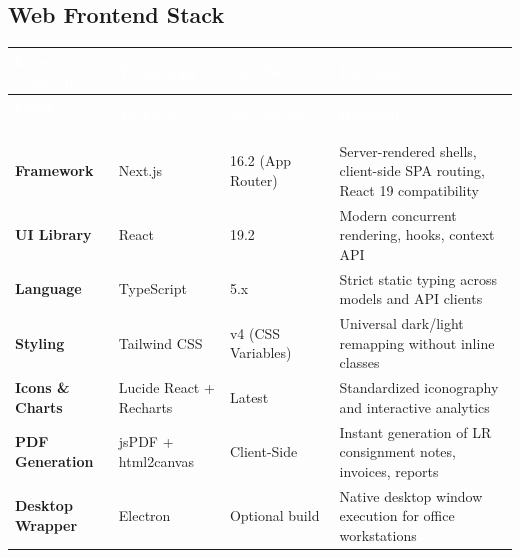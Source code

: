 \documentclass[11pt,a4paper]{article}
\newcommand{\theadstyle}[1]{\textcolor{white}{\bfseries #1}}
\begin{document}
\subsection{Web Frontend Stack}
\begin{longtable}{>{\bfseries}L{2.9cm} L{2.6cm} L{3.0cm} L{4.3cm}}
\theadstyle{Layer / Concern} & \theadstyle{Technology} & \theadstyle{Specification} & \theadstyle{Rationale} \\
\endfirsthead
{}
\theadstyle{Layer / Concern} & \theadstyle{Technology} & \theadstyle{Specification} & \theadstyle{Rationale} \\
\endhead
Framework & Next.js & 16.2 (App Router) & Server-rendered shells, client-side SPA routing, React 19 compatibility \\
UI Library & React & 19.2 & Modern concurrent rendering, hooks, context API \\
Language & TypeScript & 5.x & Strict static typing across models and API clients \\
Styling & Tailwind CSS & v4 (CSS Variables) & Universal dark/light remapping without inline classes \\
Icons \& Charts & Lucide React + Recharts & Latest & Standardized iconography and interactive analytics \\
PDF Generation & jsPDF + html2canvas & Client-Side & Instant generation of LR consignment notes, invoices, reports \\
Desktop Wrapper & Electron & Optional build & Native desktop window execution for office workstations \\
\end{longtable}
\end{document}

